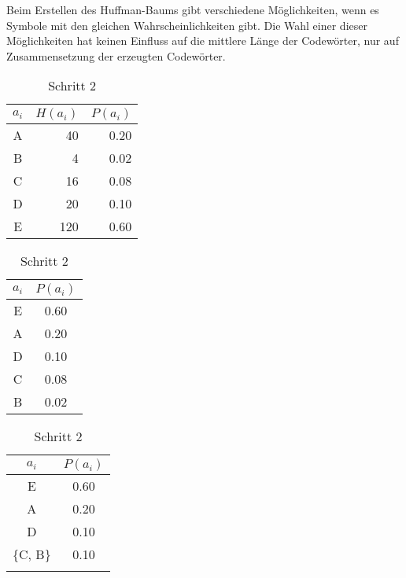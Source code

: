 \documentclass[twoside,11pt,a4paper]{article}
\theoremstyle{break}
\begin{document}
Beim Erstellen des Huffman-Baums gibt verschiedene Möglichkeiten, wenn
es Symbole mit den gleichen Wahrscheinlichkeiten gibt. Die Wahl einer
dieser Möglichkeiten hat keinen Einfluss auf die mittlere Länge der
Codewörter, nur auf Zusammensetzung der erzeugten Codewörter.

\begin{table}[h]
\centering
\caption{Beispiel für eine Häufigkeitsverteilung}

\begin{subtable}[t]{0.3\textwidth}
  \centering
  \caption{Ausgangstabelle}
  \begin{tabular}{c|r|r}
    $a_i$ & $H(a_i)$ & $P(a_i)$ \\ \hline
    A & 40   & 0.20 \\
    B & 4    & 0.02 \\
    C & 16   & 0.08 \\
    D & 20   & 0.10 \\
    E & 120  & 0.60 \\
  \end{tabular}
  \vspace{3ex}
  \label{tab:HBEX0}
\end{subtable}
\begin{subtable}[t]{0.3\textwidth}
  \centering
  \caption{Schritt 1}
  \begin{tabular}{c|c}
    $a_i$ & $P(a_i)$ \\ \hline
    E & 0.60 \\
    A & 0.20 \\
    D & 0.10 \\
    C & 0.08 \\
    B & 0.02 \\
  \end{tabular}
  \vspace{3ex}
  \label{tab:HBEX1}
\end{subtable}
\begin{subtable}[t]{0.3\textwidth}
  \centering
  \caption{Schritt 2}
  \begin{tabular}{c|c}
    $a_i$ & $P(a_i)$ \\ \hline
    E & 0.60 \\
    A & 0.20 \\
    D & 0.10 \\
    \{C, B\} & 0.10 \\ \\
  \end{tabular}
  \vspace{3ex}
  \label{tab:HBEX2}
\end{subtable}

\end{table}
\end{document}
